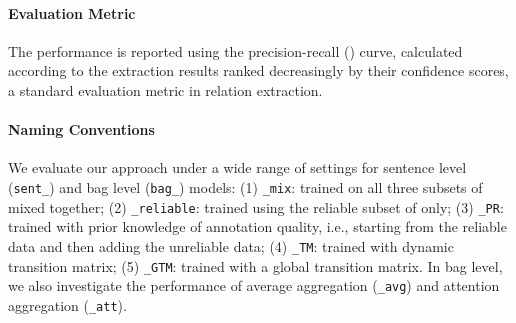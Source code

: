 \paragraph{Evaluation Metric}
The performance is reported using the precision-recall (\PR) curve, calculated according to the extraction results ranked decreasingly by their confidence scores, a standard evaluation metric in relation extraction.

\paragraph{Naming Conventions}
We evaluate our approach under a wide range of settings for
 sentence level
(\texttt{sent\_}) and bag level (\texttt{bag\_}) models:
(1) \texttt{\_mix}:  trained on all three subsets of \TimeRE mixed together;
(2) \texttt{\_reliable}:  trained using the reliable subset of \TimeRE only;
(3) \texttt{\_PR}:  trained with prior knowledge of annotation quality, i.e., starting from the reliable data and then adding the unreliable data;
(4) \texttt{\_TM}: trained with dynamic transition matrix;
(5) \texttt{\_GTM}:  trained with a global transition matrix.
%
%
In bag level, we also investigate the performance   %
of average aggregation (\texttt{\_avg})
and attention aggregation (\texttt{\_att}).



